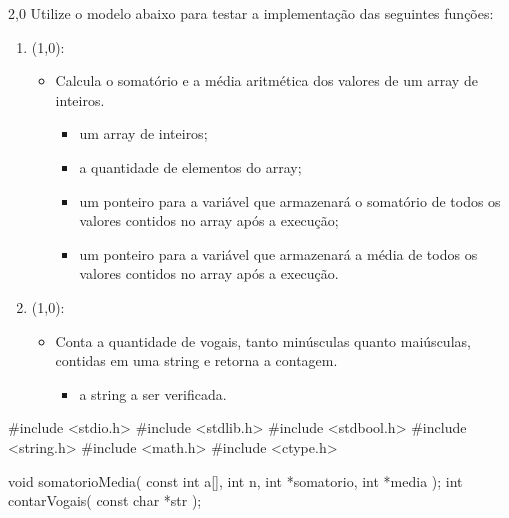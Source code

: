 \documentclass[
    12pt,     
    openright,
    twoside,  
    a4paper,  
    english,  
    brazil,   
]{memoir}
\begin{document}
\begin{questaoProgramacao}{2,0}{}{}
    Utilize o modelo abaixo para testar a implementação das seguintes funções:
    
    \begin{enumerate}
    
        \item {} (1,0):
        \begin{itemize}
            \item Calcula o somatório e a média aritmética dos valores de um array de inteiros.
            \begin{itemize}
                \item {} um array de inteiros;
                \item {} a quantidade de elementos do array;
                \item {} um ponteiro para a variável que armazenará o somatório de todos os valores contidos no array após a execução;
                \item {} um ponteiro para a variável que armazenará a média de todos os valores contidos no array após a execução.
            \end{itemize}
        \end{itemize}
        
        \item {} (1,0):
        \begin{itemize}
            \item Conta a quantidade de vogais, tanto minúsculas quanto maiúsculas, contidas em uma string e retorna a contagem.
            \begin{itemize}
                \item {} a string a ser verificada.
            \end{itemize}
        \end{itemize}
        
    \end{enumerate}
    
\begin{blocoC}
#include <stdio.h>
#include <stdlib.h>
#include <stdbool.h>
#include <string.h>
#include <math.h>
#include <ctype.h>

void somatorioMedia( const int a[], int n, int *somatorio, int *media );
int contarVogais( const char *str );


\end{blocoC}
\end{questaoProgramacao}
\end{document}
